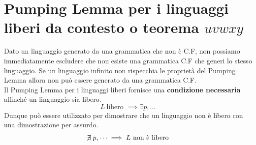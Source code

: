 \documentclass[12pt]{report}
\begin{document}
	\section{Pumping Lemma per i linguaggi liberi da contesto o teorema $uvwxy$}
	{
	}
	Dato un linguaggio generato da una grammatica che non è C.F, non possiamo immediatamente escludere che non esiste una grammatica C.F che generi lo stesso linguaggio. Se un linguaggio infinito non rispecchia le proprietà del Pumping Lemma allora non può essere generato da una grammatica C.F. \\
	Il Pumping Lemma per i linguaggi liberi fornisce una \textbf{condizione necessaria} affinché un linguaggio sia libero.\[
	L\ \text{libero } \implies \exists p, \dots
	\]
	Dunque può essere utilizzato per dimostrare che un linguaggio non è libero con una dimostrazione per assurdo. \[
	\centernot{\exists}p, \dots \implies L\ \text{non è libero}
	\]
\end{document}
